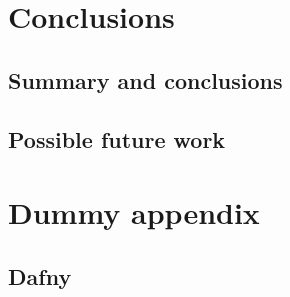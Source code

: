 \documentclass[12pt,openany,a4paper]{book}
\begin{document}
\chapter{Conclusions}

\section{Summary and conclusions}

\section{Possible future work}

\appendix


\newpage
{}
\mbox{}
\newpage



\chapter{Dummy appendix}

\section{Dafny}


\label {dafnybug1}
\end{document}
